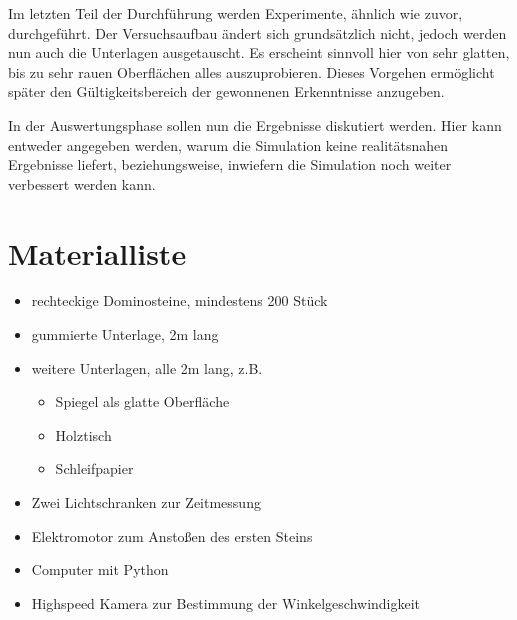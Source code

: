\documentclass[11pt,a4paper]{scrartcl}
\begin{document}
Im letzten Teil der Durchführung werden Experimente, ähnlich wie zuvor, durchgeführt. Der Versuchsaufbau ändert sich grundsätzlich nicht, jedoch werden nun auch die Unterlagen ausgetauscht. Es erscheint sinnvoll hier von sehr glatten, bis zu sehr rauen Oberflächen alles auszuprobieren. Dieses Vorgehen ermöglicht später den Gültigkeitsbereich der gewonnenen Erkenntnisse anzugeben.

In der Auswertungsphase sollen nun die Ergebnisse diskutiert werden. Hier kann entweder angegeben werden, warum die Simulation keine realitätsnahen Ergebnisse liefert, beziehungsweise, inwiefern die Simulation noch weiter verbessert werden kann.


\section{Materialliste}
\begin{itemize}
    \item rechteckige Dominosteine, mindestens 200 Stück
    \item gummierte Unterlage, 2m lang
    \item weitere Unterlagen, alle 2m lang, z.B.
    \begin{itemize}
        \item Spiegel als glatte Oberfläche
        \item Holztisch
        \item Schleifpapier
    \end{itemize}
    \item Zwei Lichtschranken zur Zeitmessung
    \item Elektromotor zum Anstoßen des ersten Steins
    \item Computer mit Python
    \item Highspeed Kamera zur Bestimmung der Winkelgeschwindigkeit \\
\end{itemize}
\end{document}
